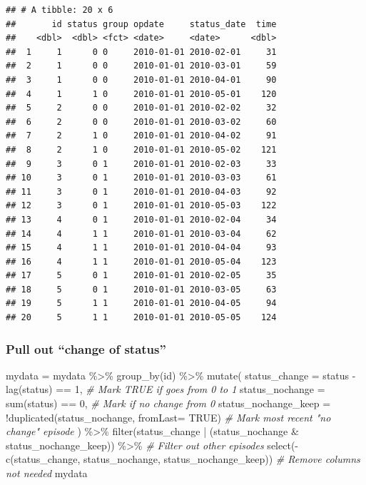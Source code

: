 \documentclass[
]{book}
\newenvironment{Shaded}{\begin{snugshade}}{\end{snugshade}}
\newcommand{\AttributeTok}[1]{\textcolor[rgb]{0.77,0.63,0.00}{#1}}
\newcommand{\CommentTok}[1]{\textcolor[rgb]{0.56,0.35,0.01}{\textit{#1}}}
\newcommand{\ConstantTok}[1]{\textcolor[rgb]{0.00,0.00,0.00}{#1}}
\newcommand{\DecValTok}[1]{\textcolor[rgb]{0.00,0.00,0.81}{#1}}
\newcommand{\FunctionTok}[1]{\textcolor[rgb]{0.00,0.00,0.00}{#1}}
\newcommand{\NormalTok}[1]{#1}
\newcommand{\OtherTok}[1]{\textcolor[rgb]{0.56,0.35,0.01}{#1}}
\newcommand{\SpecialCharTok}[1]{\textcolor[rgb]{0.00,0.00,0.00}{#1}}
\begin{document}
\begin{verbatim}
## # A tibble: 20 x 6
##       id status group opdate     status_date  time
##    <dbl>  <dbl> <fct> <date>     <date>      <dbl>
##  1     1      0 0     2010-01-01 2010-02-01     31
##  2     1      0 0     2010-01-01 2010-03-01     59
##  3     1      0 0     2010-01-01 2010-04-01     90
##  4     1      1 0     2010-01-01 2010-05-01    120
##  5     2      0 0     2010-01-01 2010-02-02     32
##  6     2      0 0     2010-01-01 2010-03-02     60
##  7     2      1 0     2010-01-01 2010-04-02     91
##  8     2      1 0     2010-01-01 2010-05-02    121
##  9     3      0 1     2010-01-01 2010-02-03     33
## 10     3      0 1     2010-01-01 2010-03-03     61
## 11     3      0 1     2010-01-01 2010-04-03     92
## 12     3      0 1     2010-01-01 2010-05-03    122
## 13     4      0 1     2010-01-01 2010-02-04     34
## 14     4      1 1     2010-01-01 2010-03-04     62
## 15     4      1 1     2010-01-01 2010-04-04     93
## 16     4      1 1     2010-01-01 2010-05-04    123
## 17     5      0 1     2010-01-01 2010-02-05     35
## 18     5      0 1     2010-01-01 2010-03-05     63
## 19     5      1 1     2010-01-01 2010-04-05     94
## 20     5      1 1     2010-01-01 2010-05-05    124
\end{verbatim}

\hypertarget{pull-out-change-of-status}{%
\subsubsection{Pull out ``change of status''}\label{pull-out-change-of-status}}

\begin{Shaded}
\begin{Highlighting}[]
\NormalTok{mydata }\OtherTok{=}\NormalTok{ mydata }\SpecialCharTok{\%\textgreater{}\%} 
  \FunctionTok{group\_by}\NormalTok{(id) }\SpecialCharTok{\%\textgreater{}\%} 
  \FunctionTok{mutate}\NormalTok{(}
    \AttributeTok{status\_change =}\NormalTok{ status }\SpecialCharTok{{-}} \FunctionTok{lag}\NormalTok{(status) }\SpecialCharTok{==} \DecValTok{1}\NormalTok{,                          }\CommentTok{\# Mark TRUE if goes from 0 to 1}
    \AttributeTok{status\_nochange =} \FunctionTok{sum}\NormalTok{(status) }\SpecialCharTok{==} \DecValTok{0}\NormalTok{,                                 }\CommentTok{\# Mark if no change from 0}
    \AttributeTok{status\_nochange\_keep =} \SpecialCharTok{!}\FunctionTok{duplicated}\NormalTok{(status\_nochange, }\AttributeTok{fromLast=} \ConstantTok{TRUE}\NormalTok{) }\CommentTok{\# Mark most recent "no change" episode}
\NormalTok{  ) }\SpecialCharTok{\%\textgreater{}\%} 
  \FunctionTok{filter}\NormalTok{(status\_change }\SpecialCharTok{|}\NormalTok{ (status\_nochange }\SpecialCharTok{\&}\NormalTok{ status\_nochange\_keep)) }\SpecialCharTok{\%\textgreater{}\%}  \CommentTok{\# Filter out other episodes}
  \FunctionTok{select}\NormalTok{(}\SpecialCharTok{{-}}\FunctionTok{c}\NormalTok{(status\_change, status\_nochange, status\_nochange\_keep))      }\CommentTok{\# Remove columns not needed}
\NormalTok{mydata}
\end{Highlighting}
\end{Shaded}
\end{document}
